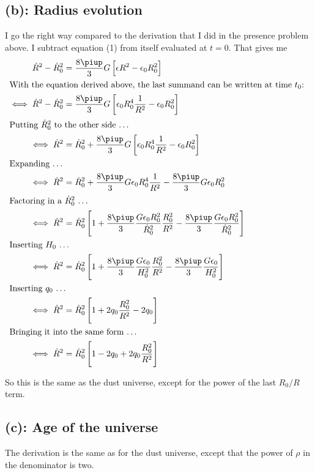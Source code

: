 \subsection*{(b): Radius evolution}

I go the right way compared to the derivation that I did in the presence
problem above. I subtract equation (1) from itself evaluated at $t=0$. That
gives me
\begin{align*}
    \dot R^2 - \dot R_0^2 &= \frac{8\piup}3 G \sbr{\epsilon R^2 - \epsilon_0 R_0^2} \\
    \intertext{%
        With the equation derived above, the last summand can be written at time
        $t_0$:
    }
    \iff \dot R^2 - \dot R_0^2 &= \frac{8\piup}3 G \sbr{\epsilon_0 R_0^4
\frac{1}{R^2} - \epsilon_0 R_0^2} \\
    \intertext{%
        Putting $\dot R_0^2$ to the other side …
    }
    \iff \dot R^2 &= \dot R_0^2 + \frac{8\piup}3 G \sbr{\epsilon_0 R_0^4
\frac{1}{R^2} - \epsilon_0 R_0^2} \\
    \intertext{%
        Expanding …
    }
    \iff \dot R^2 &= \dot R_0^2 + \frac{8\piup}3 G \epsilon_0 R_0^4
    \frac{1}{R^2} - \frac{8\piup}3 G \epsilon_0 R_0^2 \\
    \intertext{%
        Factoring in a $\dot R_0^2$ …
    }
    \iff \dot R^2 &= \dot R_0^2 \sbr{1 + \frac{8\piup}3 \frac{G \epsilon_0
    R_0^2}{\dot R_0^2} \frac{R_0^2}{R^2} - \frac{8\piup}3 \frac{G \epsilon_0
    R_0^2}{\dot R_0^2}} \\
    \intertext{%
        Inserting $H_0$ …
    }
    \iff \dot R^2 &= \dot R_0^2 \sbr{1 + \frac{8\piup}3 \frac{G \epsilon_0}{H_0^2} \frac{R_0^2}{R^2} - \frac{8\piup}3 \frac{G \epsilon_0}{H_0^2}} \\
    \intertext{%
        Inserting $q_0$ …
    }
    \iff \dot R^2 &= \dot R_0^2 \sbr{1 + 2q_0 \frac{R_0^2}{R^2} - 2q_0} \\
    \intertext{%
        Bringing it into the same form …
    }
    \iff \dot R^2 &= \dot R_0^2 \sbr{1 - 2q_0 + 2q_0 \frac{R_0^2}{R^2}}
\end{align*}

So this is the same as the dust universe, except for the power of the last
$R_0/R$ term.

\subsection*{(c): Age of the universe}

The derivation is the same as for the dust universe, except that the power of
$\rho$ in the denominator is two.

